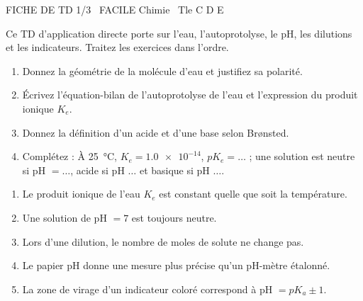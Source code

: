 \documentclass[11pt]{article}
\begin{document}
\begin{tcolorbox}[enhanced,colback=popink,colframe=popink,arc=10pt,boxrule=0pt,left=12pt,right=12pt,top=9pt,bottom=9pt]
{\color{white}\popxbold\small FICHE DE TD 1/3 \textbullet\ FACILE \hfill Chimie \textbullet\ Tle C D E\par}
\end{tcolorbox}
\vspace{4pt}
Ce TD d'application directe porte sur l'eau, l'autoprotolyse, le pH, les dilutions et les indicateurs. Traitez les exercices dans l'ordre.

\begin{exercice}
\begin{enumerate}
    \item Donnez la géométrie de la molécule d'eau et justifiez sa polarité.
    \item Écrivez l'équation-bilan de l'autoprotolyse de l'eau et l'expression du produit ionique $K_e$.
    \item Donnez la définition d'un acide et d'une base selon Brønsted.
    \item Complétez : À \SI{25}{\celsius}, $K_e = \num{1,0e-14}$, $pK_e = \dots$ ; une solution est neutre si pH $= \dots$, acide si pH $\dots$ et basique si pH $\dots$.
\end{enumerate}
\end{exercice}

\begin{exercice}
\begin{enumerate}
    \item Le produit ionique de l'eau $K_e$ est constant quelle que soit la température.
    \item Une solution de pH $= 7$ est toujours neutre.
    \item Lors d'une dilution, le nombre de moles de solute ne change pas.
    \item Le papier pH donne une mesure plus précise qu'un pH-mètre étalonné.
    \item La zone de virage d'un indicateur coloré correspond à pH $= pK_a \pm 1$.
\end{enumerate}
\end{exercice}
\end{document}

